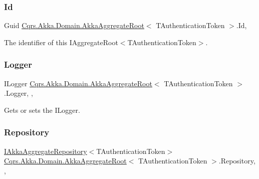 \subsubsection{\texorpdfstring{Id}{Id}}
{\footnotesize\ttfamily Guid \hyperlink{classCqrs_1_1Akka_1_1Domain_1_1AkkaAggregateRoot}{Cqrs.\+Akka.\+Domain.\+Akka\+Aggregate\+Root}$<$ T\+Authentication\+Token $>$.Id\hspace{0.3cm}{\ttfamily [get]}, {}}



The identifier of this I\+Aggregate\+Root$<$\+T\+Authentication\+Token$>$. 

\mbox{\label{classCqrs_1_1Akka_1_1Domain_1_1AkkaAggregateRoot_a685737862246db856bf3eb94345fca3f_a685737862246db856bf3eb94345fca3f}} 
\subsubsection{\texorpdfstring{Logger}{Logger}}
{\footnotesize\ttfamily I\+Logger \hyperlink{classCqrs_1_1Akka_1_1Domain_1_1AkkaAggregateRoot}{Cqrs.\+Akka.\+Domain.\+Akka\+Aggregate\+Root}$<$ T\+Authentication\+Token $>$.Logger\hspace{0.3cm}{\ttfamily [get]}, {\ttfamily [set]}, {\ttfamily [protected]}}



Gets or sets the I\+Logger. 

\mbox{\label{classCqrs_1_1Akka_1_1Domain_1_1AkkaAggregateRoot_ae15ae65ca994c5ab932d9817a9f7cb7d_ae15ae65ca994c5ab932d9817a9f7cb7d}} 
\subsubsection{\texorpdfstring{Repository}{Repository}}
{\footnotesize\ttfamily \hyperlink{interfaceCqrs_1_1Akka_1_1Domain_1_1IAkkaAggregateRepository}{I\+Akka\+Aggregate\+Repository}$<$T\+Authentication\+Token$>$ \hyperlink{classCqrs_1_1Akka_1_1Domain_1_1AkkaAggregateRoot}{Cqrs.\+Akka.\+Domain.\+Akka\+Aggregate\+Root}$<$ T\+Authentication\+Token $>$.Repository\hspace{0.3cm}{\ttfamily [get]}, {\ttfamily [set]}, {\ttfamily [protected]}}




